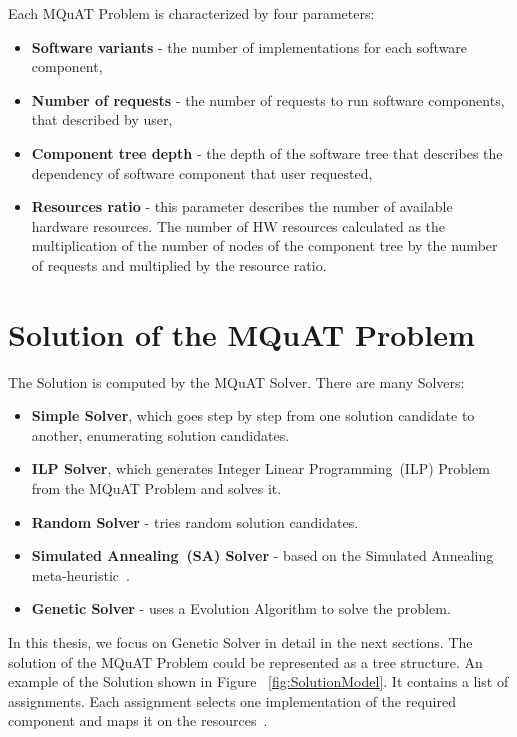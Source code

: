 Each MQuAT Problem is characterized by four parameters:

\begin{itemize}
	\item \textbf{Software variants} - the number of implementations for each software component,
	\item \textbf{Number of requests} - the number of requests to run software components, that described by user, 
	\item \textbf{Component tree depth} - the depth of the software tree that describes the dependency of software component that user requested,
	\item \textbf{Resources ratio} - this parameter describes the number of available hardware resources. The number of HW resources calculated as the multiplication of the number of nodes of the component tree by the number of requests and multiplied by the resource ratio.
\end{itemize}

\section{Solution of the MQuAT Problem}

The Solution is computed by the MQuAT Solver. There are many Solvers:

\begin{itemize}
	\item \textbf{Simple Solver}, which goes step by step from one solution candidate to another, enumerating solution candidates.
	\item \textbf{ILP Solver}, which generates Integer Linear Programming~(ILP) Problem from the MQuAT Problem and solves it.
	\item \textbf{Random Solver} - tries random solution candidates.
	\item \textbf{Simulated Annealing~(SA) Solver} - based on the Simulated Annealing meta-heuristic~\cite{pukhkaiev19}.
	\item \textbf{Genetic Solver} - uses a Evolution Algorithm to solve the problem.
\end{itemize}

In this thesis, we focus on Genetic Solver in detail in the next sections. The solution of the MQuAT Problem could be represented as a tree structure. An example of the Solution shown in Figure ~\ref{fig:SolutionModel}. It contains a list of assignments. Each assignment selects one implementation of the required component and maps it on the resources~\cite{gotz18}.



